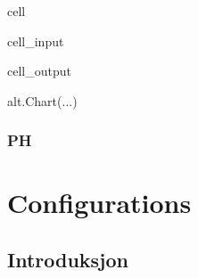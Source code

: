 \documentclass[letterpaper,10pt,english]{jupyterBook}
\begin{document}
\begin{sphinxuseclass}{cell}\begin{sphinxVerbatimInput}

\begin{sphinxuseclass}{cell_input}
\begin{sphinxVerbatim}[commandchars=\\\{\}]
   
\end{sphinxVerbatim}

\end{sphinxuseclass}\end{sphinxVerbatimInput}
\begin{sphinxVerbatimOutput}

\begin{sphinxuseclass}{cell_output}
\begin{sphinxVerbatim}[commandchars=\\\{\}]
alt.Chart(...)
\end{sphinxVerbatim}

\end{sphinxuseclass}\end{sphinxVerbatimOutput}

\end{sphinxuseclass}
\sphinxstepscope


\section{PH}
\label{\detokenize{ph:ph}}\label{\detokenize{ph::doc}}
\sphinxstepscope


\part{Configurations}

\sphinxstepscope


\chapter{Introduksjon}
\label{\detokenize{src/intro/0intro:introduksjon}}\label{\detokenize{src/intro/0intro::doc}}
\sphinxstepscope
\end{document}

